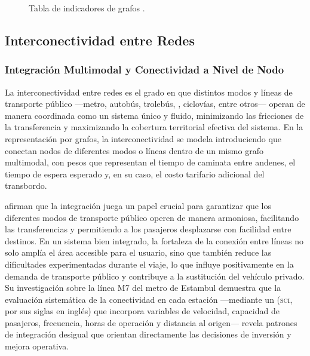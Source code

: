 \begin{figure}[H]
   \centering
   \DIFdelbeginFL %
\DIFdelendFL \DIFaddbeginFL \caption[Índices de Grafos \gtfs{}]{\DIFaddendFL Tabla de indicadores de grafos \gtfs{}.}
   \label{fig:indices-grafos}
 \end{figure}

\subsection{Interconectividad entre Redes}
\label{subsec:interconectividad}

\subsubsection{Integración Multimodal y Conectividad a Nivel de Nodo}
\label{subsubsec:integracion-multimodal}

La interconectividad entre redes es el grado en que distintos modos y líneas de
transporte público ---metro, autobús, trolebús, \brt{}, ciclovías, entre otros---
operan de manera coordinada como un sistema único y fluido, minimizando las
fricciones de la transferencia y maximizando la cobertura territorial efectiva del
sistema. En la representación por grafos, la interconectividad se modela
introduciendo  que conectan nodos de diferentes
modos o líneas dentro de un mismo grafo multimodal, con pesos que representan el
tiempo de caminata entre andenes, el tiempo de espera esperado y, en su caso, el
costo tarifario adicional del transbordo.

\textcite{ugur2025} afirman que la integración juega un papel crucial para garantizar
que los diferentes modos de transporte público operen de manera armoniosa,
facilitando las transferencias y permitiendo a los pasajeros desplazarse con facilidad
entre destinos. En un sistema bien integrado, la fortaleza de la conexión entre líneas
no solo amplía el área accesible para el usuario, sino que también reduce las
dificultades experimentadas durante el viaje, lo que influye positivamente en la
demanda de transporte público y contribuye a la sustitución del vehículo privado.
Su investigación sobre la línea M7 del metro de Estambul demuestra que la
evaluación sistemática de la conectividad en cada estación ---mediante un
 (\textsc{sci}, por sus siglas en
inglés) que incorpora variables de velocidad, capacidad de pasajeros, frecuencia,
horas de operación y distancia al origen--- revela patrones de integración desigual
que orientan directamente las decisiones de inversión y mejora operativa.

